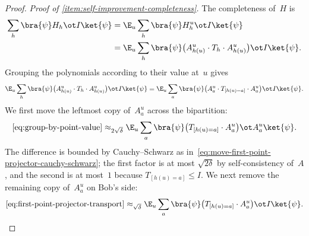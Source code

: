 \begin{proof}
  \emph{Proof of \ref{item:self-improvement-completeness}.}
  The completeness of~$H$ is
  \begin{align}
    \sum_h \bra{\psi} H_h \ot I \ket{\psi}
    &= \E_{u} \sum_h \bra{\psi} H^{u}_h \ot I \ket{\psi} \notag\\
    &= \E_{u} \sum_h \bra{\psi} \bigl(A^{u}_{h(u)} \cdot T_h \cdot A^{u}_{h(u)}\bigr) \ot I \ket{\psi}.
  \end{align}
  Grouping the polynomials according to their value at~$u$ gives
  \begin{equation}\label{eq:group-by-point-value}
    \E_{u} \sum_h \bra{\psi} \bigl(A^{u}_{h(u)} \cdot T_h \cdot A^{u}_{h(u)}\bigr) \ot I \ket{\psi}
    = \E_{u} \sum_a \bra{\psi} \bigl(A^{u}_{a} \cdot T_{[h(u) = a]} \cdot A^{u}_{a}\bigr) \ot I \ket{\psi}.
  \end{equation}
  We first move the leftmost copy of~$A^u_a$ across the bipartition:
  \begin{equation}\label{eq:first-point-projector-transport}
    \eqref{eq:group-by-point-value}
    \approx_{2\sqrt{\delta}}
    \E_{u} \sum_a \bra{\psi} \bigl(T_{[h(u)=a]} \cdot A^{u}_{a}\bigr) \ot A^{u}_{a} \ket{\psi}.
  \end{equation}
  The difference is bounded by Cauchy--Schwarz as
  in~\eqref{eq:move-first-point-projector-cauchy-schwarz}; the first factor is
  at most $\sqrt{2\delta}$ by self-consistency of~$A$, and the second is at
  most~$1$ because $T_{[h(u)=a]} \le I$.
  We next remove the remaining copy of~$A^u_a$ on Bob's side:
  \begin{equation}\label{eq:first-moved-completeness}
    \eqref{eq:first-point-projector-transport}
    \approx_{\sqrt{\delta}}
    \E_{u} \sum_a \bra{\psi} \bigl(T_{[h(u)=a]} \cdot A^{u}_{a}\bigr) \ot I \ket{\psi}.

\end{equation}
\end{proof}
